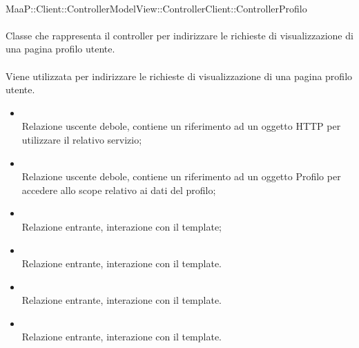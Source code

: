 \\
MaaP::Client::ControllerModelView::ControllerClient::ControllerProfilo\\
\\
Classe che rappresenta il controller per indirizzare le richieste di visualizzazione di una pagina profilo utente.\\
\\
Viene utilizzata per indirizzare le richieste di visualizzazione di una pagina profilo utente.\\
\begin{itemize}
\item{}\\
Relazione uscente debole, contiene un riferimento ad un oggetto HTTP per utilizzare il relativo servizio;
\item{}\\
Relazione uscente debole, contiene un riferimento ad un oggetto Profilo per accedere allo scope relativo ai dati del profilo;
\item{}\\
Relazione entrante, interazione con il template;
\item{}\\
Relazione entrante, interazione con il template.
\item{}\\
Relazione entrante, interazione con il template.
\item{}\\
Relazione entrante, interazione con il template.
\end{itemize}

